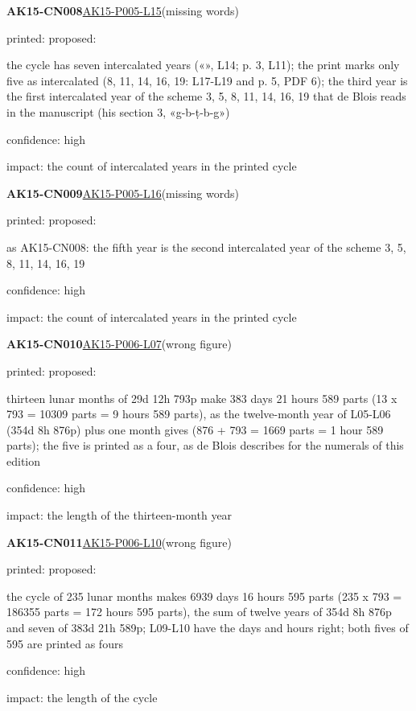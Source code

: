 \documentclass[11pt]{article}
\begin{document}
\noindent\textbf{AK15-CN008}\enspace\hyperlink{AK15-P005-L15}{AK15-P005-L15}\enspace(missing words)\par\noindent printed: \enspace proposed: \par\noindent the cycle has seven intercalated years («», L14; p. 3, L11); the print marks only five as intercalated (8, 11, 14, 16, 19: L17-L19 and p. 5, PDF 6); the third year is the first intercalated year of the scheme 3, 5, 8, 11, 14, 16, 19 that de Blois reads in the manuscript (his section 3, «g-b-ṭ-b-g»)\par\noindent confidence: high\par\noindent impact: the count of intercalated years in the printed cycle\par\medskip
\noindent\textbf{AK15-CN009}\enspace\hyperlink{AK15-P005-L16}{AK15-P005-L16}\enspace(missing words)\par\noindent printed: \enspace proposed: \par\noindent as AK15-CN008: the fifth year is the second intercalated year of the scheme 3, 5, 8, 11, 14, 16, 19\par\noindent confidence: high\par\noindent impact: the count of intercalated years in the printed cycle\par\medskip
\noindent\textbf{AK15-CN010}\enspace\hyperlink{AK15-P006-L07}{AK15-P006-L07}\enspace(wrong figure)\par\noindent printed: \enspace proposed: \par\noindent thirteen lunar months of 29d 12h 793p make 383 days 21 hours 589 parts (13 x 793 = 10309 parts = 9 hours 589 parts), as the twelve-month year of L05-L06 (354d 8h 876p) plus one month gives (876 + 793 = 1669 parts = 1 hour 589 parts); the five is printed as a four, as de Blois describes for the numerals of this edition\par\noindent confidence: high\par\noindent impact: the length of the thirteen-month year\par\medskip
\noindent\textbf{AK15-CN011}\enspace\hyperlink{AK15-P006-L10}{AK15-P006-L10}\enspace(wrong figure)\par\noindent printed: \enspace proposed: \par\noindent the cycle of 235 lunar months makes 6939 days 16 hours 595 parts (235 x 793 = 186355 parts = 172 hours 595 parts), the sum of twelve years of 354d 8h 876p and seven of 383d 21h 589p; L09-L10 have the days and hours right; both fives of 595 are printed as fours\par\noindent confidence: high\par\noindent impact: the length of the cycle\par\medskip
\end{document}
